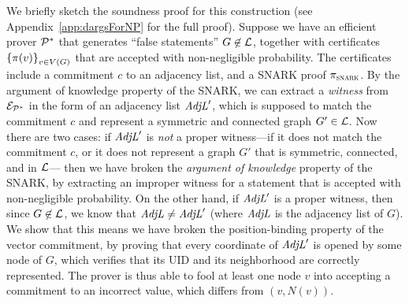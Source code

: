 We briefly sketch the soundness proof for this construction (see Appendix~\ref{app:dargsForNP} for the full proof).
Suppose we have an efficient prover $\mathcal{P}^*$ that generates ``false statements''
$G \not \in \mathcal{L}$,
together with certificates $\left \{{\pi(v)} \right \}_{v \in V(G)}$
that are accepted with non-negligible probability.
The certificates include a commitment $c$ to an adjacency list, and a SNARK proof $\pi_\textsc{snark}$.
By the argument of knowledge property of the SNARK, we can extract a \emph{witness} from $\mathcal{E}_{\mathcal{P}^*}$ in the form of an adjacency list $\mathit{ AdjL }'$,
which is supposed to match the commitment $c$ and represent a symmetric and connected graph $G' \in \mathcal{L}$.
Now there are two cases:
if $\mathit{ AdjL }'$ is \emph{not} a proper witness---if it does not match the commitment $c$,
or it does not represent a graph $G'$ that is symmetric, connected, and in $\mathcal{L}$---%
then we have broken the \emph{argument of knowledge} property of the SNARK,
by extracting an improper witness for a statement that is accepted with non-negligible probability.
On the other hand, if $\mathit{ AdjL }'$ is a proper witness,
then since $G \not \in \mathcal{L}$, we know that $\mathit{ AdjL } \neq \mathit{ AdjL }'$ (where $\mathit{ AdjL }$
is the adjacency list of $G$).
We show that this means we have broken the position-binding property of the vector commitment,
by proving that every coordinate of $\mathit{ AdjL }'$ is opened by some node of $G$,
which verifies that its UID and its neighborhood are correctly represented.
The prover is thus able to fool at least one node $v$ into accepting a commitment to
an incorrect value, which differs from $(v, N(v))$.
